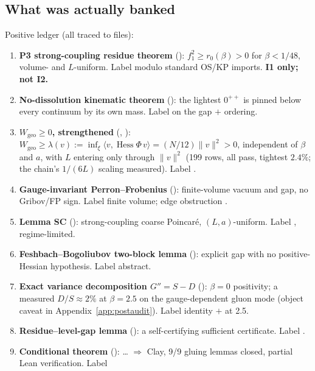 \subsection{What was actually banked}

Positive ledger (all traced to files):

\begin{enumerate}
\item \textbf{P3 strong-coupling residue theorem} ():
  $f_1^2\ge r_0(\beta)>0$ for $\beta<1/48$, volume- and $L$-uniform. Label \LT{} modulo standard
  OS/KP imports. \textbf{I1 only; not I2.}
\item \textbf{No-dissolution kinematic theorem} (): the
  lightest $0^{++}$ is pinned below every continuum by its own mass. Label \LC{} on the gap $+$
  ordering.
\item \textbf{$W_{\mathrm{geo}}\ge0$, strengthened} (,
  ): $W_{\mathrm{geo}}\ge\lambda(v):=\inf_\xi\langle v,\operatorname{Hess}\Phi\,
  v\rangle=(N/12)\lVert v\rVert^2>0$, independent of $\beta$ and $a$, with $L$ entering only through
  $\lVert v\rVert^2$ (199 rows, all pass, tightest $2.4\%$; the chain's $1/(6L)$ scaling measured).
  Label \LT.
\item \textbf{Gauge-invariant Perron--Frobenius} ():
  finite-volume vacuum and gap, no Gribov/FP sign. Label \LT{} finite volume; edge obstruction
  \LN.
\item \textbf{Lemma SC} (): strong-coupling coarse Poincar\'e,
  $(L,a)$-uniform. Label \LT, regime-limited.
\item \textbf{Feshbach--Bogoliubov two-block lemma} (): explicit gap with no
  positive-Hessian hypothesis. Label \LT{} abstract.
\item \textbf{Exact variance decomposition $G''=S-D$} ():
  $\beta=0$ positivity; a measured $D/S\approx2\%$ at $\beta=2.5$ on the gauge-dependent gluon
  mode (object caveat in Appendix~\ref{app:postaudit}). Label \LT{} identity $+$ \LM{} at 2.5.
\item \textbf{Residue--level-gap lemma} (): a self-certifying sufficient
  certificate. Label \LT.
\item \textbf{Conditional theorem} ():  \ldots{}
   $\Rightarrow$ Clay, 9/9 gluing lemmas closed, partial Lean verification. Label

\end{enumerate}
